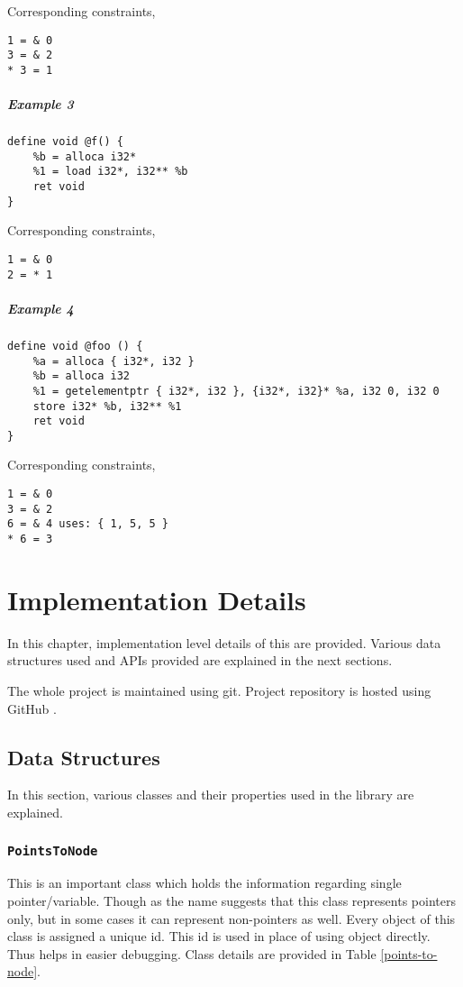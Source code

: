 \documentclass[a4paper,12pt]{report}
\begin{document}
Corresponding constraints,
\begin{lstlisting}
1 = & 0
3 = & 2
* 3 = 1
\end{lstlisting}

\paragraph{Example 3}
\begin{verbatim}
define void @f() {
    %b = alloca i32*
    %1 = load i32*, i32** %b
    ret void
}
\end{verbatim}

Corresponding constraints,
\begin{lstlisting}
1 = & 0
2 = * 1
\end{lstlisting}

\paragraph{Example 4}

\begin{verbatim}
define void @foo () {
    %a = alloca { i32*, i32 }
    %b = alloca i32
    %1 = getelementptr { i32*, i32 }, {i32*, i32}* %a, i32 0, i32 0
    store i32* %b, i32** %1
    ret void
}
\end{verbatim}

Corresponding constraints,
\begin{lstlisting}
1 = & 0
3 = & 2
6 = & 4 uses: { 1, 5, 5 }
* 6 = 3
\end{lstlisting}

\chapter{Implementation Details}
In this chapter, implementation level details of this are provided. Various 
data structures used and APIs provided are explained in the next sections.

The whole project is maintained using git. Project repository is hosted using
GitHub \cite{GitHub}.

\section{Data Structures}
In this section, various classes and their properties used in the library are 
explained.

\subsection{\texttt{PointsToNode}}
This is an important class which holds the information regarding single 
pointer/variable. Though as the name suggests that this class represents 
pointers only, but in some cases it can represent non-pointers as well.
Every object of this class is assigned a unique id. This id is used in place 
of using object directly. Thus helps in easier debugging. Class details are provided in Table \ref{points-to-node}.
\end{document}
